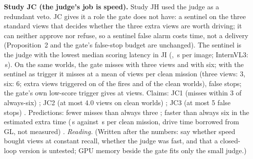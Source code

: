 \textbf{Study JC (the judge's job is speed).} Study JH used the judge as a redundant veto. JC gives it a role the gate does not have: a sentinel on the three standard views that decides whether the three extra views are worth driving; it can neither approve nor refuse, so a sentinel false alarm costs time, not a delivery (Proposition~2 and the gate's false-stop budget are unchanged). The sentinel is the judge with the lowest median scoring latency in JI (\JCPrimary{}, \JCLatSent\,s per image; InternVL3: \JCLatIntern\,s). On the same worlds, the gate misses \JCThreeMiss{} with three views and \JCSixMiss{} with six; with the sentinel as trigger it misses \JCSentMiss{} at a mean of \JCSentViews{} views per clean mission (three views: 3, six: 6; extra views triggered on \JCTrigFire{} of the fires and \JCTrigClean{} of the clean worlds), \JCSentFS{} false stops; the gate's own low-score trigger gives \JCOwnMiss{} at \JCOwnViews{} views. Claims: JC1 (misses within 3 of always-six) \JCOneHolds; JC2 (at most 4.0 views on clean worlds) \JCTwoHolds; JC3 (at most 5 false stops) \JCThreeHolds. Predictions: fewer misses than always three \JCPredOneHolds; faster than always six in the estimated extra time (\JCSentSecs\,s against \JCSixSecs\,s per clean mission, drive time borrowed from GL, not measured) \JCPredTwoHolds.
\emph{Reading.} (Written after the numbers: say whether speed bought views at constant recall, whether the judge was fast, and that a closed-loop version is untested; GPU memory beside the gate fits only the small judge.)
